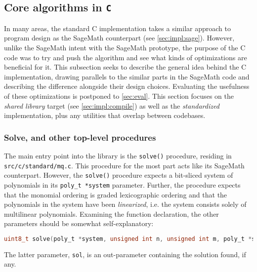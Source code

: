 \subsection{Core algorithms in \texttt{C}} \label{sec:impl:c}

In many areas, the standard C implementation takes a similar approach to program design as the SageMath counterpart (see \cref{sec:impl:sage}). However, unlike the SageMath intent with the SageMath prototype, the purpose of the C code was to try and push the algorithm and see what kinds of optimizations are beneficial for it. This subsection seeks to describe the general idea behind the C implementation, drawing parallels to the similar parts in the SageMath code and describing the difference alongside their design choices. Evaluating the usefulness of these optimizations is postponed to \cref{sec:eval}. This section focuses on the \textit{shared library} target (see \cref{sec:impl:compile}) as well as the \textit{standardized} implementation, plus any utilities that overlap between codebases.

\subsubsection{Solve, and other top-level procedures} 

The main entry point into the library is the \texttt{solve()} procedure, residing in \texttt{src/c/standard/mq.c}. This procedure for the most part acts like its SageMath counterpart. However, the \texttt{solve()} procedure expects a bit-sliced system of polynomials in its \texttt{poly\_t *system} parameter. Further, the procedure expects that the monomial ordering is graded lexicographic ordering and that the polynomials in the system have been \textit{linearized}, i.e. the system consists solely of multilinear polynomials. Examining the function declaration, the other parameters should be somewhat self-explanatory:
\begin{lstlisting}[language=c,style=mystyle]
uint8_t solve(poly_t *system, unsigned int n, unsigned int m, poly_t *sol)
\end{lstlisting}
The latter parameter, \texttt{sol}, is an out-parameter containing the solution found, if any.

